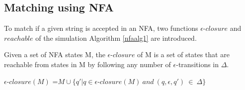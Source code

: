 \subsection{Matching using NFA}
To match if a given string is accepted in an NFA, two functions $\epsilon$-$closure$ and $reachable$ of the simulation Algorithm \ref{nfaalg1} are introduced.
\begin{mydef}
Given a set of NFA states M, the $\epsilon $-$ closure$ of M is a set of states that are reachable from states in M by following any number of $\epsilon$-transitions in $\Delta$.
\begin{center}
$\epsilon$-$closure(M)$ =$ M \cup \{q'|q\in \epsilon$-$closure(M) ~and ~(q,\epsilon,q') ~ \in ~ \Delta\}$
\end{center}
\cite[p. 34, def 2.2]{compile}
\end{mydef}

